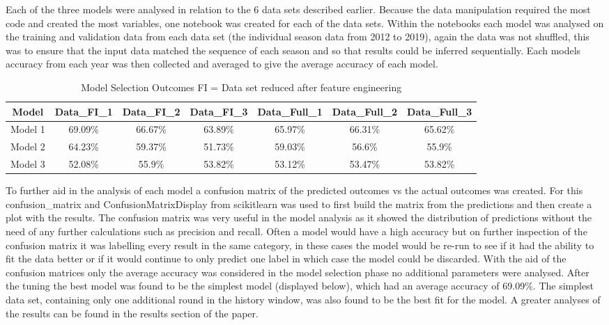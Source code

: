 \documentclass{imc-inf}
\begin{document}
	Each of the three models were analysed in relation to the 6 data sets described earlier. Because the data manipulation required the most code and created the most variables, one notebook was created for each of the data sets. Within the notebooks each model was analysed on the training and validation data from each data set (the individual season data from 2012 to 2019), again the data was not shuffled, this was to ensure that the input data matched the sequence of each season and so that results could be inferred sequentially. Each models accuracy from each year was then collected and averaged to give the average accuracy of each model.
	
	\begin{table}[h!]
		\centering	
		\begin{tabular}{| c | c | c | c | c | c | c |}
			\hline
			Model & Data\_FI\_1 & Data\_FI\_2 & Data\_FI\_3 & Data\_Full\_1 & Data\_Full\_2 & Data\_Full\_3\\
			\hline
			Model 1 & 69.09\% & 66.67\% & 63.89\% & 65.97\% & 66.31\% & 65.62\% \\
			\hline
			Model 2 & 64.23\% & 59.37\% & 51.73\% & 59.03\% & 56.6\% & 55.9\% \\
			\hline
			Model 3 & 52.08\% & 55.9\% & 53.82\% & 53.12\% & 53.47\% & 53.82\% \\
			\hline
		\end{tabular}
		\caption{\label {tab:ModelSelection} Model Selection Outcomes \newline FI = Data set reduced after feature engineering}
	\end{table}
	
	To further aid in the analysis of each model a confusion matrix of the predicted outcomes vs the actual outcomes was created. For this confusion\_matrix and ConfusionMatrixDisplay from scikitlearn was used to first build the matrix from the predictions and then create a plot with the results. The confusion matrix was very useful in the model analysis as it showed the distribution of predictions without the need of any further calculations such as precision and recall. Often a model would have a high accuracy but on further inspection of the confusion matrix it was labelling every result in the same category, in these cases the model would be re-run to see if it had the ability to fit the data better or if it would continue to only predict one label in which case the model could be discarded.
	With the aid of the confusion matrices only the average accuracy was considered in the model selection phase no additional parameters were analysed. After the tuning the best model was found to be the simplest model (displayed below), which had an average accuracy of 69.09\%. The simplest data set, containing only one additional round in the history window, was also found to be the best fit for the model. A greater analyses of the results can be found in the results section of the paper. 
	
\end{document}
